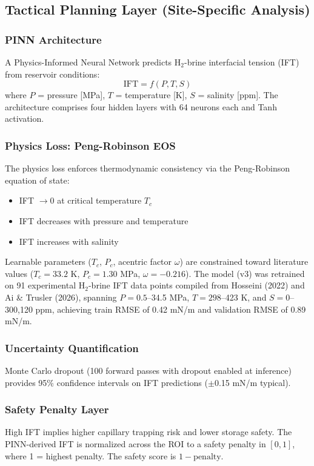 \documentclass[11pt]{article}
\begin{document}
\subsection{Tactical Planning Layer (Site-Specific Analysis)}

\subsubsection{PINN Architecture}
A Physics-Informed Neural Network predicts H$_2$-brine interfacial tension (IFT) from reservoir conditions:
\begin{equation}
\text{IFT} = f(P, T, S)
\end{equation}
where $P$ = pressure [MPa], $T$ = temperature [K], $S$ = salinity [ppm]. The architecture comprises four hidden layers with 64 neurons each and Tanh activation.

\subsubsection{Physics Loss: Peng-Robinson EOS}
The physics loss enforces thermodynamic consistency via the Peng-Robinson equation of state:
\begin{itemize}
    \item IFT $\to 0$ at critical temperature $T_c$
    \item IFT decreases with pressure and temperature
    \item IFT increases with salinity
\end{itemize}
Learnable parameters ($T_c$, $P_c$, acentric factor $\omega$) are constrained toward literature values ($T_c = 33.2$ K, $P_c = 1.30$ MPa, $\omega = -0.216$). The model (v3) was retrained on 91 experimental H$_2$-brine IFT data points compiled from Hosseini (2022) and Ai \& Trusler (2026), spanning $P = 0.5$--34.5 MPa, $T = 298$--423 K, and $S = 0$--300,120 ppm, achieving train RMSE of 0.42 mN/m and validation RMSE of 0.89 mN/m.

\subsubsection{Uncertainty Quantification}
Monte Carlo dropout (100 forward passes with dropout enabled at inference) provides 95\% confidence intervals on IFT predictions ($\pm$0.15 mN/m typical).

\subsubsection{Safety Penalty Layer}
High IFT implies higher capillary trapping risk and lower storage safety. The PINN-derived IFT is normalized across the ROI to a safety penalty in $[0, 1]$, where 1 = highest penalty. The safety score is $1 - \text{penalty}$.
\end{document}
